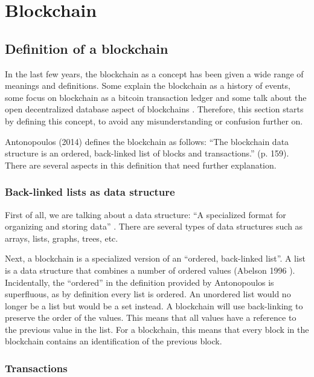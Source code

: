 \section{Blockchain}

\subsection{Definition of a blockchain}

\iffalse
todo: 
- different interpretations of blockchain
- reread and remove weird references
\fi

In the last few years, the blockchain as a concept has been given a wide range of meanings and definitions. Some explain the blockchain as a history of events, some focus on blockchain as a bitcoin transaction ledger and some talk about the open decentralized database aspect of blockchains \cite{blockchain-multiple-definitions}. Therefore, this section starts by defining this concept, to avoid any misunderstanding or confusion further on.

Antonopoulos (2014) \cite{antonopoulos:2014} defines the blockchain as follows: ``The blockchain data structure is an ordered, back-linked list of blocks and transactions.'' (p. 159). There are several aspects in this definition that need further explanation.

\subsubsection{Back-linked lists as data structure}

First of all, we are talking about a data structure: ``A specialized format for organizing and storing data'' \cite{data-structure}. There are several types of data structures such as arrays, lists, graphs, trees, etc.

Next, a blockchain is a specialized version of an ``ordered, back-linked list''. A list is a data structure that combines a number of ordered values (Abelson 1996 \cite{abelson:1996}).  Incidentally, the ``ordered'' in the definition provided by Antonopoulos is superfluous, as by definition every list is ordered. An unordered list would no longer be a list but would be a set instead. A blockchain will use back-linking to preserve the order of the values. This means that all values have a reference to the previous value in the list. For a blockchain, this means that every block in the blockchain contains an identification of the previous block.

\subsubsection{Transactions}

